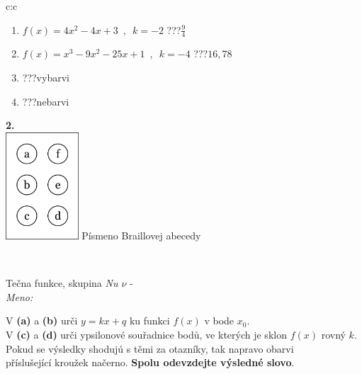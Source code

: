 \documentclass[10pt]{report}
\begin{document}
\begin{tabular}{c:c}
\begin{minipage}[c][104.5mm][t]{0.5\linewidth}
\begin{center}
\begin{minipage}{0.79\linewidth}
\begin{center}
\begin{varwidth}{\linewidth}
\begin{enumerate}
\item $f(x)=4x^2-4x+3\enspace , \enspace k=-2$\quad \dotfill\; ???\;\dotfill \quad $\frac{9}{4}$
\item $f(x)=x^3-9x^2-25x+1\enspace , \enspace k=-4$\quad \dotfill\; ???\;\dotfill \quad $16 , 78$
\item \quad \dotfill\; ???\;\dotfill \quad vybarvi
\item \quad \dotfill\; ???\;\dotfill \quad nebarvi
\end{enumerate}
\end{varwidth}
\end{center}
\end{minipage}
\begin{minipage}{0.20\linewidth}
\begin{center}
{\Huge\bfseries 2.} \\[2mm]
\includegraphics[height=40mm]{../images/braille.png}
{\small Písmeno Braillovej abecedy}
\end{center}
\end{minipage}
\end{center}
\end{minipage}
\\ \hdashline
\begin{minipage}[c][104.5mm][t]{0.5\linewidth}
\begin{center}
\vspace{7mm}
{\huge Tečna funkce, skupina \textit{Nu $\nu$} -}\\[5mm]
\textit{Meno:}\phantom{xxxxxxxxxxxxxxxxxxxxxxxxxxxxxxxxxxxxxxxxxxxxxxxxxxxxxxxxxxxxxxxxx}\\[5mm]
\begin{minipage}{0.95\linewidth}
\begin{center}
V \textbf{(a)} a \textbf{(b)} urči  $y = kx + q$ ku funkci $f(x)$ v bode $x_0$.\\V \textbf{(c)} a \textbf{(d)} urči ypsilonové souřadnice bodů, ve kterých je sklon $f(x)$ rovný $k$.\\Pokud se výsledky shodujú s těmi za otazníky, tak napravo obarvi\\příslušející kroužek načerno. \textbf{Spolu odevzdejte výsledné slovo}.

\end{center}
\end{minipage}
\end{center}
\end{minipage}
\end{tabular}
\end{document}
